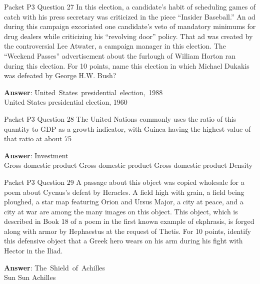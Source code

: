 \begin{frame}{Packet P3 Question 27}
In this election, a candidate's habit of scheduling games of catch with his press secretary was criticized in the piece ``Insider Baseball.'' An ad during this campaign excoriated one candidate's veto of mandatory minimums for drug dealers while criticizing his ``revolving door'' policy. That ad was created by the controversial Lee Atwater, a campaign manager in this election. The ``Weekend Passes'' advertisement about the furlough of William Horton ran during this election. For 10 points, name this election in which Michael Dukakis was defeated       by George H.W. Bush?  

\textbf{Answer}: United\ States\ presidential\ election,\ 1988\\
 United States presidential election, 1960
\end{frame}

\begin{frame}{Packet P3 Question 28}
The United Nations commonly uses the ratio of this quantity to GDP as a growth indicator, with Guinea   having the highest value of that ratio at about 75%

\textbf{Answer}: Investment\\
 Gross domestic product
 Gross domestic product
 Gross domestic product
 Density
\end{frame}

\begin{frame}{Packet P3 Question 29}
A passage about this object was copied wholesale for a poem about Cycnus’s defeat by Heracles. A field high with grain, a field being ploughed, a star map featuring Orion and Ursus Major, a city at peace, and a city at war are among the many images on this object. This object, which   is described in Book 18 of a poem in the first known example of ekphrasis, is     forged along with armor by Hephaestus at the request of Thetis. For 10 points, identify this defensive object that a Greek hero wears on his arm during his fight with Hector in the Iliad.    

\textbf{Answer}: The\ Shield\ of\ Achilles\\
 Sun
 Sun
 Achilles
\end{frame}

